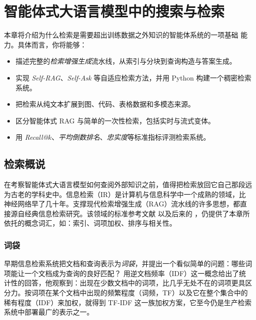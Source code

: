 
\chapter{智能体式大语言模型中的搜索与检索}\label{sec:rag}


\begin{learningbox}
本章将介绍为什么检索是需要超出训练数据之外知识的智能体系统的一项基础
能力。具体而言，你将能够：
\begin{itemize}[leftmargin=*, nosep]
    \item 描述完整的{\em 检索增强生成}流水线，从索引与分块到查询构造与答案生成。
    \item 实现 \textit{Self-RAG}、\textit{Self-Ask} 等自适应检索方法，并用 Python 构建一个稠密检索系统。
    \item 把检索从纯文本扩展到图、代码、表格数据和多模态来源。
    \item 区分智能体式 RAG 与简单的一次性检索，包括实时与流式变体。
    \item 用 \textit{Recall@$k$}、\textit{平均倒数排名}、\textit{忠实度}等标准指标评测检索系统。
\end{itemize}
\end{learningbox}



\section{检索概说}
\label{sec:retrieval-origins}

在考察智能体式大语言模型如何查阅外部知识之前，值得把检索放回它自己那段远为古老的学科史中。信息检索（IR）是计算机与信息科学中一个成熟的领域，比神经网络早了几十年。支撑现代检索增强生成（RAG）流水线的许多思想，都直接源自经典信息检索研究。该领域的标准参考文献 \citet{salton1983introduction} 以及后来的 \citet{manning2008introduction}，仍提供了本章所依托的概念词汇，如：索引、词项加权、排序与相关性。

\subsection{词袋}

早期信息检索系统把文档和查询表示为\emph{词袋}，并提出一个看似简单的问题：哪些词项能让一个文档成为查询的良好匹配？\citet{sparckjones1972statistical} 用逆文档频率（IDF）这一概念给出了统计性的回答，他观察到：出现在少数文档中的词项，比几乎无处不在的词项更具区分力。按词项在某个文档中出现的频繁程度（词频，TF）以及它在整个集合中的稀有程度（IDF）来加权，就得到 TF-IDF 这一族加权方案，它至今仍是生产检索系统中部署最广的表示之一。

